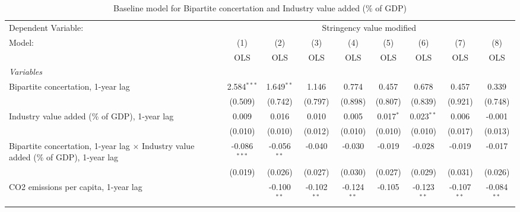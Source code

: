 
\begin{table}[htbp]
   \caption{Baseline model for Bipartite concertation and Industry value added (\% of GDP)}
   \centering
   \begin{tabular}{lcccccccc}
      \toprule
      Dependent Variable: & \multicolumn{8}{c}{Stringency value modified}\\
      Model:                                                                                     & (1)            & (2)           & (3)           & (4)           & (5)          & (6)           & (7)           & (8)\\  
                                                                                                 &  OLS           & OLS           & OLS           & OLS           & OLS          & OLS           & OLS           & OLS\\  
      \midrule
      \emph{Variables}\\
      Bipartite concertation, 1-year lag                                                         & 2.584$^{***}$  & 1.649$^{**}$  & 1.146         & 0.774         & 0.457        & 0.678         & 0.457         & 0.339\\   
                                                                                                 & (0.509)        & (0.742)       & (0.797)       & (0.898)       & (0.807)      & (0.839)       & (0.921)       & (0.748)\\   
      Industry value added (\% of GDP), 1-year lag                                               & 0.009          & 0.016         & 0.010         & 0.005         & 0.017$^{*}$  & 0.023$^{**}$  & 0.006         & -0.001\\   
                                                                                                 & (0.010)        & (0.010)       & (0.012)       & (0.010)       & (0.010)      & (0.010)       & (0.017)       & (0.013)\\   
      Bipartite concertation, 1-year lag $\times$ Industry value added (\% of GDP), 1-year lag   & -0.086$^{***}$ & -0.056$^{**}$ & -0.040        & -0.030        & -0.019       & -0.028        & -0.019        & -0.017\\   
                                                                                                 & (0.019)        & (0.026)       & (0.027)       & (0.030)       & (0.027)      & (0.029)       & (0.031)       & (0.026)\\   
      CO2 emissions per capita, 1-year lag                                                       &                & -0.100$^{**}$ & -0.102$^{**}$ & -0.124$^{**}$ & -0.105       & -0.123$^{**}$ & -0.107$^{**}$ & -0.084$^{**}$\\   

\end{tabular}
\end{table}
